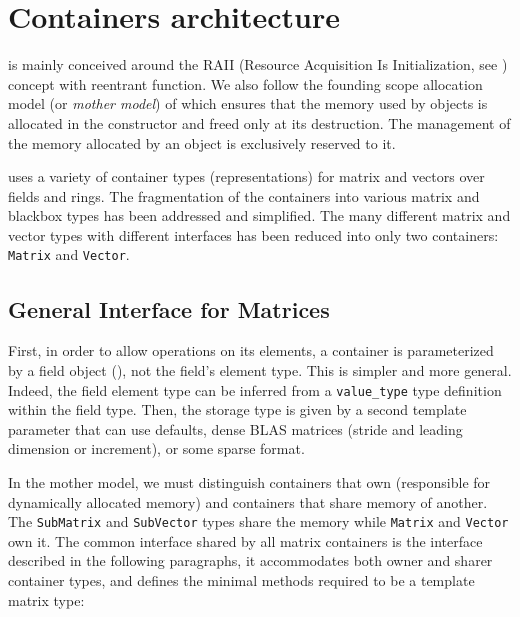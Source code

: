 \section{Containers architecture}\label{sec:container}
%
\linbox is mainly conceived around the RAII (Resource Acquisition Is
Initialization, see \cite{stroustrup1994design}) concept with reentrant
function. We also follow the {founding scope allocation} model (or \emph{mother
model}) of \cite{Dumas:2010:lbpar} which ensures that the memory used by
objects is allocated in the constructor and freed only at its destruction. The
management of the memory allocated by an object is exclusively reserved to it.
%
\par
%
\linbox uses a variety of container types (representations) for matrix and vectors over fields and rings.
The fragmentation of the containers into various matrix and
blackbox types has been addressed and simplified. The many different matrix and
vector types with different interfaces has been reduced into only two
containers: \texttt{Matrix} and
\texttt{Vector}.
%
\subsection{General Interface for %
Matrices}
%
First, in order to allow operations on its elements, a container is
parameterized by a field object (), not the field's element
type. This is simpler and more general.
Indeed, the field element type can be inferred from a
\verb!value_type! type definition within the field type.
Then, the storage type is given by a second
template parameter that can use defaults,
\eg dense BLAS matrices (stride
and leading dimension or increment), or some sparse format.
%

%
In the mother model, we must distinguish containers that own (responsible
for dynamically allocated memory) and containers that share memory of another.  The
\texttt{SubMatrix} and \texttt{SubVector} types share the memory while
\texttt{Matrix} and \texttt{Vector} own it.
%
The common interface shared by all matrix containers is the \applin  interface
described in the following paragraphs, it accommodates both owner and sharer
container types, and defines the minimal methods required to be a
template \applin matrix type:
%
% 
%
%

